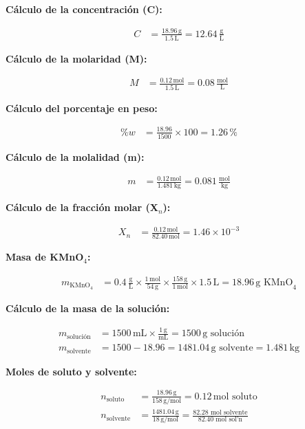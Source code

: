 \documentclass{article}
\begin{document}
\textbf{Cálculo de la concentración (C):}

\begin{align*}
    C &= \frac{18.96 \, \text{g}}{1.5 \, \text{L}} = 12.64 \, \frac{\text{g}}{\text{L}}
\end{align*}

\textbf{Cálculo de la molaridad (M):}

\begin{align*}
    M &= \frac{0.12 \, \text{mol}}{1.5 \, \text{L}} = 0.08 \, \frac{\text{mol}}{\text{L}}
\end{align*}

\textbf{Cálculo del porcentaje en peso:}

\begin{align*}
    \%w &= \frac{18.96}{1500} \times 100 = 1.26 \, \%
\end{align*}

\textbf{Cálculo de la molalidad (m):}

\begin{align*}
    m &= \frac{0.12 \, \text{mol}}{1.481 \, \text{kg}} = 0.081 \, \frac{\text{mol}}{\text{kg}}
\end{align*}

\textbf{Cálculo de la fracción molar (X$_n$):}

\begin{align*}
    X_n &= \frac{0.12 \, \text{mol}}{82.40 \, \text{mol}} = 1.46 \times 10^{-3}
\end{align*}


\textbf{Masa de KMnO$_4$:}

\begin{align*}
    m_{\text{KMnO}_4} &= 0.4 \, \frac{\text{g}}{\text{L}} \times \frac{1 \, \text{mol}}{54 \, \text{g}} \times \frac{158 \, \text{g}}{1 \, \text{mol}} \times 1.5 \, \text{L} = 18.96 \, \text{g KMnO}_4
\end{align*}

\textbf{Cálculo de la masa de la solución:}

\begin{align*}
    m_{\text{solución}} &= 1500 \, \text{mL} \times \frac{1 \, \text{g}}{\text{mL}} = 1500 \, \text{g solución} \\[10pt]
    m_{\text{solvente}} &= 1500 - 18.96 = 1481.04 \, \text{g solvente} = 1.481 \, \text{kg}
\end{align*}

\textbf{Moles de soluto y solvente:}

\begin{align*}
    n_{\text{soluto}} &= \frac{18.96 \, \text{g}}{158 \, \text{g/mol}} = 0.12 \, \text{mol soluto} \\[10pt]
    n_{\text{solvente}} &= \frac{1481.04 \, \text{g}}{18 \, \text{g/mol}} = \frac{82.28\text{ mol solvente}}{82.40\text{ mol sol'n}} \,  \\[10pt]
\end{align*}
\end{document}
